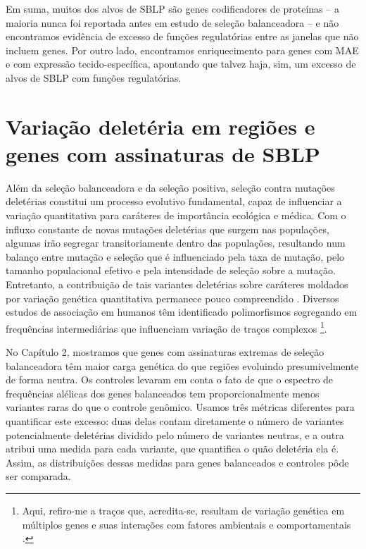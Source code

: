 \begin{refsection}
Em suma, muitos dos alvos de SBLP são genes codificadores de proteínas -- a maioria nunca foi reportada antes em estudo de seleção balanceadora -- e não encontramos evidência de excesso de funções regulatórias entre as janelas que não incluem genes. Por outro lado, encontramos enriquecimento para genes com MAE e com expressão tecido-específica, apontando que talvez haja, sim, um excesso de alvos de SBLP com funções regulatórias. 



\section{Variação deletéria em regiões e genes com assinaturas de SBLP}

Além da seleção balanceadora e da seleção positiva, seleção contra mutações deletérias constitui um processo evolutivo fundamental, capaz de influenciar a variação quantitativa para caráteres de importância ecológica e médica. Com o influxo constante de novas mutações deletérias que surgem nas populações, algumas irão segregar transitoriamente dentro das populações, resultando num balanço entre mutação e seleção que é influenciado pela taxa de mutação, pelo tamanho populacional efetivo e pela intensidade de seleção sobre a mutação. Entretanto, a contribuição de tais variantes deletérias sobre caráteres moldados por variação genética quantitativa permanece pouco compreendido \parencite{Mitchell-Olds2007}. Diversos estudos de associação em humanos têm identificado polimorfismos segregando em frequências intermediárias que influenciam variação de traços complexos \parencite{Mitchell-Olds2007}\footnote{Aqui, refiro-me a traços que, acredita-se, resultam de variação genética em múltiplos genes e suas interações com fatores ambientais e comportamentais \parencite{Mitchell-Olds2007}.}.

No Capítulo 2, mostramos que genes com assinaturas extremas de seleção balanceadora têm maior carga genética do que regiões evoluindo presumivelmente de forma neutra. Os controles levaram em conta o fato de que o espectro de frequências alélicas dos genes balanceados tem proporcionalmente menos variantes raras do que o controle genômico. Usamos três métricas diferentes para quantificar este excesso: duas delas contam diretamente o número de variantes potencialmente deletérias dividido pelo número de variantes neutras, e a outra atribui uma medida 
para cada variante, que quantifica o quão deletéria ela é. Assim, as distribuições dessas medidas para genes balanceados e controles pôde ser comparada. 


\end{refsection}
